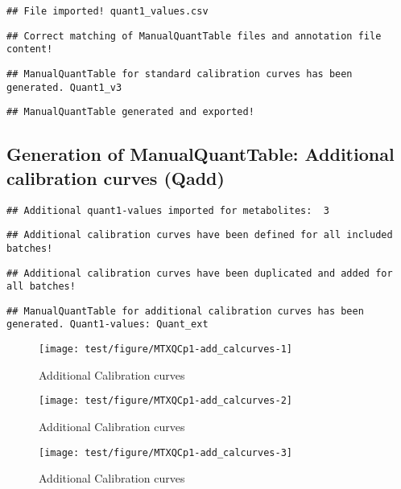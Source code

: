 \documentclass[9pt,]{article}
\begin{document}
\begin{verbatim}
## File imported! quant1_values.csv
\end{verbatim}

\begin{verbatim}
## Correct matching of ManualQuantTable files and annotation file content!
\end{verbatim}

\begin{verbatim}
## ManualQuantTable for standard calibration curves has been generated. Quant1_v3
\end{verbatim}

\begin{verbatim}
## ManualQuantTable generated and exported!
\end{verbatim}

\subsection{Generation of ManualQuantTable: Additional calibration
curves
(Qadd)}\label{generation-of-manualquanttable-additional-calibration-curves-qadd}

\begin{verbatim}
## Additional quant1-values imported for metabolites:  3
\end{verbatim}

\begin{verbatim}
## Additional calibration curves have been defined for all included batches!
\end{verbatim}

\begin{verbatim}
## Additional calibration curves have been duplicated and added for all batches!
\end{verbatim}

\begin{verbatim}
## ManualQuantTable for additional calibration curves has been generated. Quant1-values: Quant_ext
\end{verbatim}

\begin{figure}

{\centering \texttt{[image: test/figure/MTXQCp1-add\_calcurves-1]} 

}

\caption{Additional Calibration curves}\label{fig:add_calcurves1}
\end{figure}\begin{figure}

{\centering \texttt{[image: test/figure/MTXQCp1-add\_calcurves-2]} 

}

\caption{Additional Calibration curves}\label{fig:add_calcurves2}
\end{figure}\begin{figure}

{\centering \texttt{[image: test/figure/MTXQCp1-add\_calcurves-3]} 

}

\caption{Additional Calibration curves}\label{fig:add_calcurves3}
\end{figure}
\end{document}
